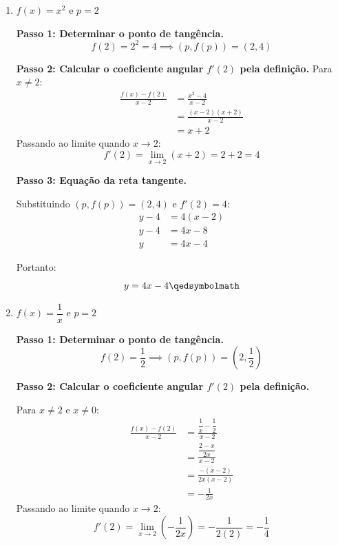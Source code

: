 \begin{enumerate}[label=\alph*)]
    \item $f(x) = x^2$ e $p = 2$
    
    \textbf{Passo 1: Determinar o ponto de tangência.}
    \[
    f(2) = 2^2 = 4 \implies (p, f(p)) = (2, 4)
    \]

    \textbf{Passo 2: Calcular o coeficiente angular $f'(2)$ pela definição.}
    Para $x \neq 2$:
    \begin{align*}
        \frac{f(x) - f(2)}{x - 2} &= \frac{x^2 - 4}{x - 2} \\[0.25cm]
        &= \frac{(x - 2)(x + 2)}{x - 2} \\[0.25cm]
        &= x + 2
    \end{align*}
    Passando ao limite quando $x \to 2$:
    \[
    f'(2) = \lim_{x \to 2} (x + 2) = 2 + 2 = 4
    \]

    \textbf{Passo 3: Equação da reta tangente.}

    Substituindo $(p, f(p)) = (2, 4)$ e $f'(2) = 4$:
    \begin{align*}
        y - 4 &= 4(x - 2) \\[0.25cm]
        y - 4 &= 4x - 8 \\[0.25cm]
        y &= 4x - 4
    \end{align*}

    Portanto:
    \[
    y = 4x - 4 \qedsymbolmath
    \]

    \item $f(x) = \dfrac{1}{x}$ e $p = 2$
    
    \textbf{Passo 1: Determinar o ponto de tangência.}
    \[
    f(2) = \frac{1}{2} \implies (p, f(p)) = \left(2, \frac{1}{2}\right)
    \]

    \textbf{Passo 2: Calcular o coeficiente angular $f'(2)$ pela definição.}

    Para $x \neq 2$ e $x \neq 0$:
    \begin{align*}
        \frac{f(x) - f(2)}{x - 2} &= \frac{\dfrac{1}{x} - \dfrac{1}{2}}{x - 2} \\[0.25cm]
        &= \frac{\dfrac{2 - x}{2x}}{x - 2} \\[0.25cm]
        &= \frac{-(x - 2)}{2x(x - 2)} \\[0.25cm]
        &= -\frac{1}{2x}
    \end{align*}
    Passando ao limite quando $x \to 2$:
    \[
    f'(2) = \lim_{x \to 2} \left(-\frac{1}{2x}\right) = -\frac{1}{2(2)} = -\frac{1}{4}
    \]


\end{enumerate}
